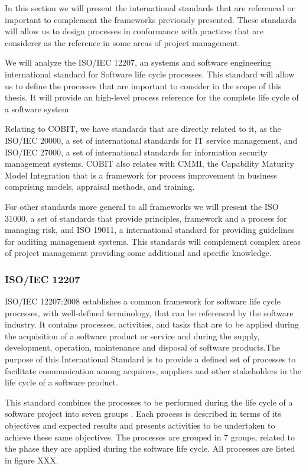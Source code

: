 In this section we will present the international standards that are referenced or important to complement the frameworks previously presented. These standards will allow us to design processes in conformance with practices that are considerer as the reference in some areas of project management.\par
We will analyze the ISO/IEC 12207, an systems and software engineering international standard for Software life cycle processes. This standard will allow us to define the processes that are important to consider in the scope of this thesis. It will provide an high-level process reference for the complete life cycle of a software system\par
Relating to COBIT, we have standards that are directly related to it, as the ISO/IEC 20000, a set of international standards for IT service management, and ISO/IEC 27000, a set of international standards for information security management systems. COBIT also relates with CMMI, the Capability Maturity Model Integration that is a framework for process improvement in business comprising models, appraisal methods, and training.\par
For other standards more general to all frameworks we will present the ISO 31000, a set of standards that provide principles, framework and a process for managing risk, and ISO 19011, a international standard for providing guidelines for auditing management systems. This standards will complement complex areas of project management providing some additional and specific knowledge.

\subsubsection{ISO/IEC 12207}

ISO/IEC 12207:2008 establishes a common framework for software life cycle processes, with well-defined terminology, that can be referenced by the software industry. It contains processes, activities, and tasks that are to be applied during the acquisition of a software product or service and during the supply, development, operation, maintenance and disposal of software products.The purpose of this International Standard is to provide a defined set of processes to facilitate communication among acquirers, suppliers and other stakeholders in the life cycle of a software product.\par
This standard combines the processes to be performed during the life cycle of a software project into seven groups . Each process is described in terms of its objectives and expected results and presents activities to be undertaken to achieve these same objectives. The processes are grouped in 7 groups, related to the phase they are applied during the software life cycle. All processes are listed in figure XXX.

